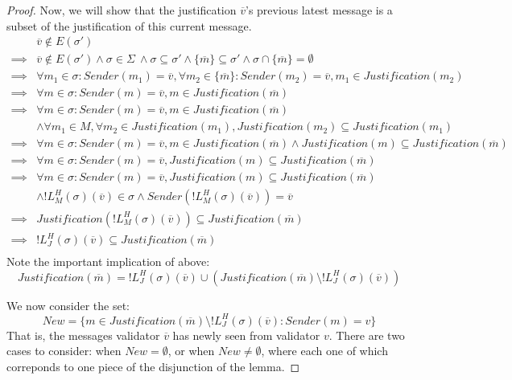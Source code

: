 \begin{proof}
Now, we will show that the justification $\overline{v}$'s previous latest message is a subset of the justification of this current message.
\begin{align}
          &\overline{v} \notin E(\sigma') \\
  \implies& \overline{v} \notin E(\sigma') \land \sigma \in \Sigma ~\land \sigma \subseteq \sigma' \land \{\overline{m}\} \subseteq \sigma' \land \sigma \cap \{\overline{m}\} = \emptyset \\
  \implies& \forall m_1 \in \sigma: Sender(m_1) = \overline{v}, \forall m_2 \in \{\overline{m}\}: Sender(m_2) = \overline{v}, m_1 \in Justification(m_2) \\
  \implies& \forall m \in \sigma: Sender(m) = \overline{v}, m \in Justification(\overline{m}) \\
  \implies& \forall m \in \sigma: Sender(m) = \overline{v}, m \in Justification(\overline{m}) \\
          &\land \forall m_1 \in M, \forall m_2 \in Justification(m_1), Justification(m_2) \subseteq Justification(m_1) \\
  \implies& \forall m \in \sigma: Sender(m) = \overline{v}, m \in Justification(\overline{m}) \land Justification(m) \subseteq Justification(\overline{m}) \\
  \implies& \forall m \in \sigma: Sender(m) = \overline{v}, Justification(m) \subseteq Justification(\overline{m}) \\
  \implies& \forall m \in \sigma: Sender(m) = \overline{v}, Justification(m) \subseteq Justification(\overline{m}) \\
          &\land !L^H_M(\sigma)(\overline{v}) \in \sigma \land Sender(!L^H_M(\sigma)(\overline{v})) = \overline{v} \\
  \implies& Justification(!L^H_M(\sigma)(\overline{v})) \subseteq Justification(\overline{m}) \\
  \implies& !L^H_J(\sigma)(\overline{v}) \subseteq Justification(\overline{m}) \\
\end{align}
Note the important implication of above:
$$
Justification(\overline{m}) = !L^H_J(\sigma)(\overline{v}) \cup (Justification(\overline{m}) \setminus !L^H_J(\sigma)(\overline{v}))
$$

We now consider the set:
$$
New = \{ m \in Justification(\overline{m}) \setminus !L^H_J(\sigma)(\overline{v}): Sender(m) = v \}
$$
That is, the messages validator $\overline{v}$ has newly seen from validator $v$. There are two cases to consider: when $New = \emptyset$, or when $New \neq \emptyset$, where each one of which correponds to one piece of the disjunction of the lemma.


\end{proof}
